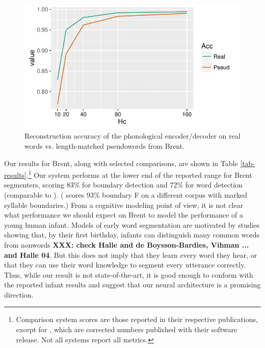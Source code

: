 \documentclass[11pt,letterpaper]{article}
\newcommand{\xxx}[1]{\textbf{\color{red}XXX: #1}}
\begin{document}
\begin{figure}
\includegraphics[width=\columnwidth]{capacity.pdf}
\caption{Reconstruction accuracy of the phonological encoder/decoder
  on real words vs. length-matched pseudowords from Brent.}
\label{fig-capacity}
\end{figure}

Our results for Brent, along with selected comparisons, are shown in
Table \ref{tab-results}.\footnote{Comparison system scores are those
  reported in their respective publications, except for
  , which are corrected numbers published with
  their software release. Not all systems report all metrics.} Our
system performs at the lower end of the reported range for Brent
segmenters, scoring 83\% for boundary detection and 72\% for word
detection (comparable to \cite{Fleck08}). ( scores
93\% boundary F on a different corpus with marked syllable
boundaries.) From a cognitive modeling point of view, it is not clear
what performance we should expect on Brent to model the performance of
a young human infant. Models of early word segmentation are motivated
by studies showing that, by their first birthday, infants can
distinguish many common words from nonwords \cite{Swingley05}
\xxx{check Halle and de Boysson-Bardies, Vihman ... and Halle 04}. But
this does not imply that they learn every word they hear, or that they
can use their word knowledge to segment every utterance
correctly. Thus, while our result is not state-of-the-art, it is good
enough to conform with the reported infant results and suggest that
our neural architecture is a promising direction.

\end{document}
